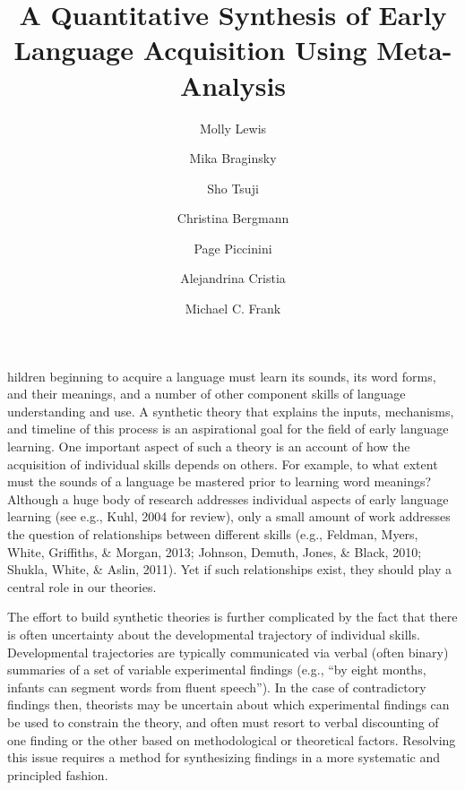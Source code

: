 \documentclass[9pt,twocolumn,twoside,lineno]{pnas-new}
\title{A Quantitative Synthesis of Early Language Acquisition Using
Meta-Analysis}
\author[a]{ Molly Lewis}
\author[b]{Mika Braginsky}
\author[c]{Sho Tsuji}
\author[c]{Christina Bergmann}
\author[d]{Page Piccinini}
\author[c]{ Alejandrina Cristia}
\author[a]{Michael C. Frank}
\affil[a]{Department of Psychology, Stanford University}
\affil[b]{Department of Brain and Cognitive Sciences, MIT}
\affil[c]{Laboratoire de Sciences Cognitives et Psycholinguistique, ENS}
\affil[d]{ NeuroPsychologie Interventionnelle, ENS }
\begin{document}
\verticaladjustment{-2pt}

\maketitle
\thispagestyle{firststyle}

hildren beginning to acquire a language must learn its sounds, its word
forms, and their meanings, and a number of other component skills of
language understanding and use. A synthetic theory that explains the
inputs, mechanisms, and timeline of this process is an aspirational goal
for the field of early language learning. One important aspect of such a
theory is an account of how the acquisition of individual skills depends
on others. For example, to what extent must the sounds of a language be
mastered prior to learning word meanings? Although a huge body of
research addresses individual aspects of early language learning (see
e.g., Kuhl, 2004 for review), only a small amount of work addresses the
question of relationships between different skills (e.g., Feldman,
Myers, White, Griffiths, \& Morgan, 2013; Johnson, Demuth, Jones, \&
Black, 2010; Shukla, White, \& Aslin, 2011). Yet if such relationships
exist, they should play a central role in our theories.

The effort to build synthetic theories is further complicated by the
fact that there is often uncertainty about the developmental trajectory
of individual skills. Developmental trajectories are typically
communicated via verbal (often binary) summaries of a set of variable
experimental findings (e.g., \enquote{by eight months, infants can
segment words from fluent speech}). In the case of contradictory
findings then, theorists may be uncertain about which experimental
findings can be used to constrain the theory, and often must resort to
verbal discounting of one finding or the other based on methodological
or theoretical factors. Resolving this issue requires a method for
synthesizing findings in a more systematic and principled fashion.
\end{document}

